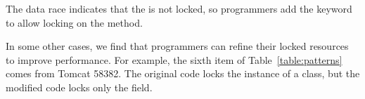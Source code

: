 The data race indicates that the  is not locked, so programmers add the  keyword to allow locking on the method.


%
%








In some other cases, we find that programmers can refine their locked resources to improve performance. For example, the sixth item of Table~\ref{table:patterns} comes from Tomcat 58382. The original code locks the instance of a class, but the modified code locks only the  field.

